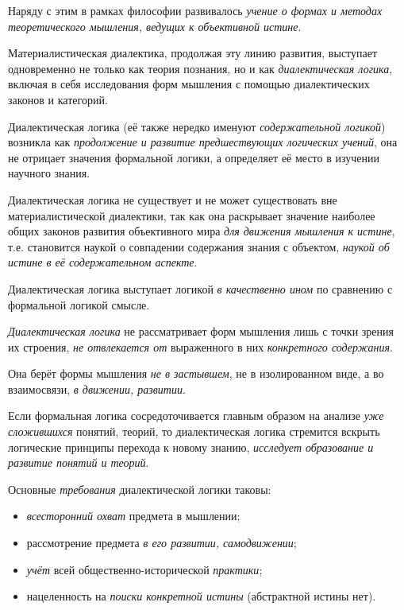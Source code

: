 \documentclass[a4paper,14pt,russian]{extreport}
\begin{document}
Наряду с этим в рамках философии развивалось \emph{учение о формах и методах теоретического мышления, ведущих к объективной истине}.

Материалистическая диалектика, продолжая эту линию развития, выступает одновременно не только как теория познания, но и как \emph{диалектическая логика}, включая в себя исследования форм мышления с помощью диалектических законов и категорий.

Диалектическая логика (её также нередко именуют \emph{содержательной логикой}) возникла как \emph{продолжение и развитие предшествующих логических учений}, она не отрицает значения формальной логики, а определяет её место в изучении научного знания.

Диалектическая логика не существует и не может существовать вне материалистической диалектики, так как она раскрывает значение наиболее общих законов развития объективного мира \emph{для движения мышления к истине}, т.е. становится наукой о совпадении содержания знания с объектом, \emph{наукой об истине в её содержательном аспекте}.

Диалектическая логика выступает логикой \emph{в качественно ином} по сравнению с формальной логикой смысле.

\emph{Диалектическая логика} не рассматривает форм мышления лишь с точки зрения их строения, \emph{не отвлекается от} выраженного в них \emph{конкретного содержания}.

Она берёт формы мышления \emph{не в застывшем}, не в изолированном виде, а во взаимосвязи, \emph{в движении, развитии}.

Если формальная логика сосредоточивается главным образом на анализе \emph{уже сложившихся} понятий, теорий, то диалектическая логика стремится вскрыть логические принципы перехода к новому знанию, \emph{исследует образование и развитие понятий и теорий}.

Основные \emph{требования} диалектической логики таковы:

\begin{itemize}
\item \emph{всесторонний охват} предмета в мышлении;
\item рассмотрение предмета \emph{в его развитии, самодвижении};
\item \emph{учёт} всей общественно-исторической \emph{практики};
\item нацеленность на \emph{поиски конкретной истины} (абстрактной истины нет).
\end{itemize}
\end{document}

